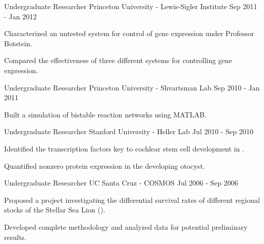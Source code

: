 \begin{cventries}
{    }
  \cventry
    {Undergraduate Researcher} %
    {Princeton University - Lewis-Sigler Institute} %
    {} %
    {Sep 2011 - Jan 2012} %
    {
      \begin{cvitems} %
        \item Characterized an untested system for control of gene expression under Professor Botstein.
        \item Compared the effectiveness of three different systems for controlling gene expression.
      \end{cvitems}
    }
  \cventry
    {Undergraduate Researcher} %
    {Princeton University - Shvartsman Lab} %
    {} %
    {Sep 2010 - Jan 2011} %
    {
      \begin{cvitems} %
        \item Built a simulation of bistable reaction networks using MATLAB.
      \end{cvitems}
    }
  \cventry
    {Undergraduate Researcher} %
    {Stanford University - Heller Lab} %
    {} %
    {Jul 2010 - Sep 2010} %
    {
      \begin{cvitems} %
        \item Identified the transcription factors key to cochlear stem cell development in \gal.
        \item Quantified nonzero protein expression in the developing otocyst.
      \end{cvitems}
    }
  \cventry
    {Undergraduate Researcher} %
    {UC Santa Cruz - COSMOS} %
    {} %
    {Jul 2006 - Sep 2006} %
    {
      \begin{cvitems} %
        \item Proposed a project investigating the differential survival rates of different regional stocks of the Stellar Sea Lion (\ejub).
        \item Developed complete methodology and analyzed data for potential preliminary results.
      \end{cvitems}
    }
\fi
\end{cventries}
